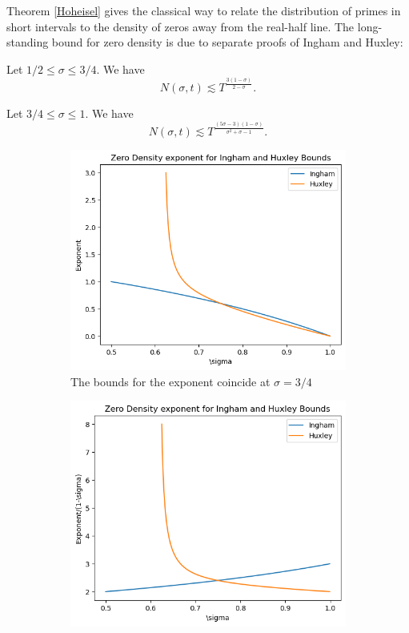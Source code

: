 Theorem \ref{Hoheisel} gives the classical way to relate the distribution of primes in short intervals to the density of zeros away from the real-half line. The long-standing bound for zero density is due to separate proofs of Ingham and Huxley:
\begin{theorem}
    Let $1/2\leq \sigma\leq 3/4$. We have \[
        N(\sigma,t)\lesssim T^{\frac{3(1-\sigma)}{2-\sigma}}.
        \]
\end{theorem}
\begin{theorem}
    Let $3/4\leq \sigma\leq 1$. We have \[
        N(\sigma,t)\lesssim T^{\frac{(5\sigma-3)(1-\sigma)}{\sigma^2+\sigma-1}}.
        \]
\end{theorem}
\begin{figure}[h]
    \centering
    \begin{subfigure}{0.4\textwidth}
        \includegraphics[width=\textwidth]{inghamhuxley1.png}
        \caption{The bounds for the exponent coincide at $\sigma=3/4$}
    \end{subfigure}
    \begin{subfigure}{0.4\textwidth}
        \includegraphics[width=\textwidth]{inghamhuxley2.png}

\end{subfigure}
\end{figure}
